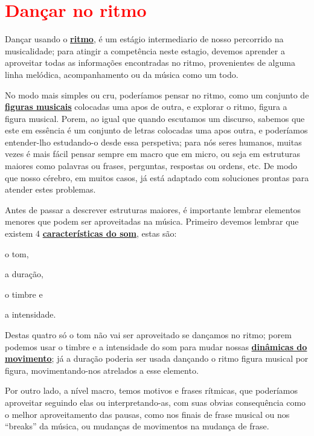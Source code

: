 

\section{\textcolor{red}{Dançar no ritmo}}
\label{subsec:dancaritmo}
 Dançar usando o \hyperref[sec:pos:Ritmo]{\textbf{ritmo}},
é um estágio intermediario de nosso percorrido na musicalidade;
para atingir a competência neste estagio, 
devemos aprender a aproveitar todas as informações encontradas 
no ritmo, provenientes de alguma linha melódica, acompanhamento ou da música como um todo.

No modo mais simples ou cru, poderíamos pensar no ritmo,
como um conjunto de \hyperref[sec:figurasmusicais]{\textbf{figuras musicais}} 
colocadas uma apos de outra, 
e explorar o ritmo, figura a figura musical. %
Porem, ao igual que quando escutamos um discurso,
sabemos que este em essência é um conjunto de letras colocadas uma apos outra,
e poderíamos entender-lho estudando-o desde essa perspetiva;
para nós seres humanos, 
muitas vezes é mais fácil pensar sempre em macro que em micro,
ou seja em estruturas maiores como palavras ou frases, perguntas, respostas ou ordens, etc. 
De modo que nosso cérebro, em muitos casos, 
já está adaptado com soluciones prontas para atender estes problemas.

Antes de passar a descrever estruturas maiores, 
é importante lembrar elementos menores que podem ser aproveitadas na música.
Primeiro devemos lembrar que existem 4 \hyperref[sec:carateristasom]{\textbf{características do som}},
estas são: 
\begin{inparaitem}
\item o tom, 
\item a duração, 
\item o timbre e 
\item a intensidade.
\end{inparaitem}
Destas quatro só o tom não vai ser aproveitado se dançamos no ritmo;
porem podemos usar o timbre e a intensidade do som para mudar nossas 
\hyperref[sec:musicalidade:dinamicas]{\textbf{dinâmicas do movimento}};
já a duração poderia ser usada dançando o ritmo figura musical por figura,
movimentando-nos atrelados a esse elemento.

Por outro lado, a nível macro, temos  motivos e frases rítmicas,
que poderíamos aproveitar seguindo elas ou interpretando-as, 
com suas obvias consequência como o melhor aproveitamento das pausas, 
como nos finais de frase musical ou nos ``breaks'' da música,
ou mudanças de movimentos na mudança de frase.

